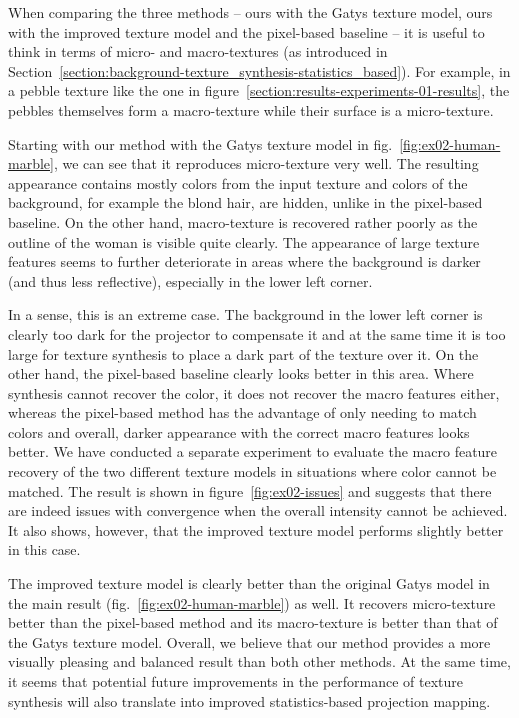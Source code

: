 When comparing the three methods -- ours with the Gatys texture model, ours with the improved texture model and the pixel-based baseline -- it is useful to think in terms of micro- and macro-textures (as introduced in Section~\ref{section:background-texture_synthesis-statistics_based}). For example, in a pebble texture like the one in figure~\ref{section:results-experiments-01-results}, the pebbles themselves form a macro-texture while their surface is a micro-texture.

Starting with our method with the Gatys texture model in fig.~\ref{fig:ex02-human-marble}, we can see that it reproduces micro-texture very well. The resulting appearance contains mostly colors from the input texture and colors of the background, for example the blond hair, are hidden, unlike in the pixel-based baseline. On the other hand, macro-texture is recovered rather poorly as the outline of the woman is visible quite clearly. The appearance of large texture features seems to further deteriorate in areas where the background is darker (and thus less reflective), especially in the lower left corner.

In a sense, this is an extreme case. The background in the lower left corner is clearly too dark for the projector to compensate it and at the same time it is too large for texture synthesis to place a dark part of the texture over it. On the other hand, the pixel-based baseline clearly looks better in this area. Where synthesis cannot recover the color, it does not recover the macro features either, whereas the pixel-based method has the advantage of only needing to match colors and overall, darker appearance with the correct macro features looks better. We have conducted a separate experiment to evaluate the macro feature recovery of the two different texture models in situations where color cannot be matched. The result is shown in figure~\ref{fig:ex02-issues} and suggests that there are indeed issues with convergence when the overall intensity cannot be achieved. It also shows, however, that the improved texture model performs slightly better in this case.

The improved texture model is clearly better than the original Gatys model in the main result (fig.~\ref{fig:ex02-human-marble}) as well. It recovers micro-texture better than the pixel-based method and its macro-texture is better than that of the Gatys texture model. Overall, we believe that our method provides a more visually pleasing and balanced result than both other methods. At the same time, it seems that potential future improvements in the performance of texture synthesis will also translate into improved statistics-based projection mapping.

